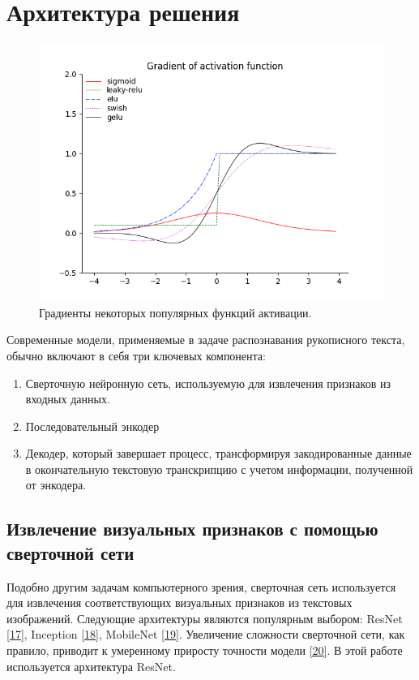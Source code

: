 \section{Архитектура решения}
\label{sec:Chapter1} 

\begin{figure}
    \centering
    \includegraphics[scale=0.8]{./images/activation-funs-grad.png}
    \caption{\protect\hypertarget{image1}{Градиенты некоторых популярных функций активации.}}
\end{figure}


Современные модели, применяемые в задаче распознавания рукописного текста, обычно включают в себя три ключевых компонента:
\begin{enumerate}
\item Сверточную нейронную сеть, используемую для извлечения признаков из входных данных.
\item Последовательный энкодер
\item Декодер, который завершает процесс, трансформируя закодированные данные в окончательную текстовую транскрипцию с учетом информации, полученной от энкодера.
\end{enumerate}

\subsection{Извлечение визуальных признаков с помощью сверточной сети}
Подобно другим задачам компьютерного зрения, сверточная сеть используется для извлечения соответствующих визуальных признаков из текстовых изображений. Следующие архитектуры являются популярным выбором: ResNet \hyperlink{cite.Kai15}{[17]}, Inception \hyperlink{cite.Sze14}{[18]}, MobileNet \hyperlink{cite.San18}{[19]}. Увеличение сложности сверточной сети, как правило, приводит к умеренному приросту точности модели \hyperlink{cite.Her21}{[20]}. В этой работе используется архитектура ResNet. 

